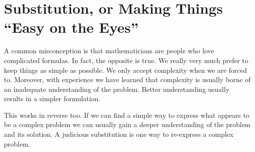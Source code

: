  \section{Substitution, or Making Things ``Easy on the Eyes''}
 \label{sec:an-easy-problem-alg}
A common misconception is that mathematicians are people who love
complicated formulas. In fact, the opposite is true. We really very
much prefer to keep things as simple as possible. We only
accept complexity when we are forced to. Moreover, with experience we have
learned that complexity is usually borne of an inadequate understanding of
the problem.  Better understanding usually results in  a simpler
formulation.

This works in reverse too. If we can find a simple way to express what
appears to be a complex problem we can usually gain a deeper
understanding of the problem and its solution. A judicious
substitution is one way to re-express a complex problem.


